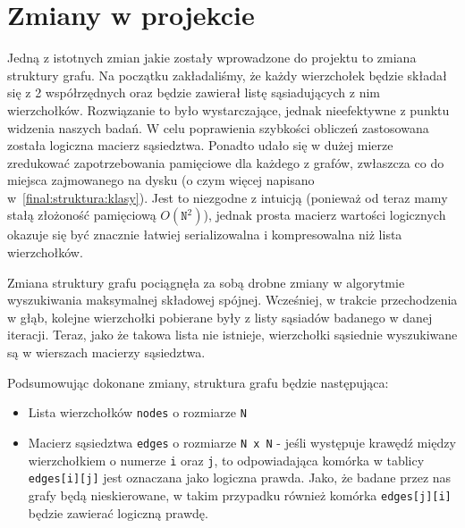 
\section{Zmiany w projekcie}
	\label{final:zmiany}

	Jedną z istotnych zmian jakie zostały wprowadzone do projektu to zmiana struktury grafu. Na początku zakładaliśmy, że każdy wierzchołek będzie składał się z 2 współrzędnych oraz będzie zawierał listę sąsiadujących z nim wierzchołków. Rozwiązanie to było wystarczające, jednak nieefektywne z punktu widzenia naszych badań. W celu poprawienia szybkości obliczeń zastosowana została logiczna macierz sąsiedztwa. Ponadto udało się w dużej mierze zredukować zapotrzebowania pamięciowe dla każdego z grafów, zwłaszcza co do miejsca zajmowanego na dysku (o czym więcej napisano w~\ref{final:struktura:klasy}). Jest to niezgodne z intuicją (ponieważ od teraz mamy stałą złożoność pamięciową $O(\texttt{N}^2)$), jednak prosta macierz wartości logicznych okazuje się być znacznie łatwiej serializowalna i kompresowalna niż lista wierzchołków.

	Zmiana struktury grafu pociągnęła za sobą drobne zmiany w algorytmie wyszukiwania maksymalnej składowej spójnej. Wcześniej, w trakcie przechodzenia w głąb, kolejne wierzchołki pobierane były z listy sąsiadów badanego w danej iteracji. Teraz, jako że takowa lista nie istnieje, wierzchołki sąsiednie wyszukiwane są w wierszach macierzy sąsiedztwa.

	Podsumowując dokonane zmiany, struktura grafu będzie następująca:
	\begin{itemize}
		\item Lista wierzchołków \texttt{nodes} o rozmiarze \texttt{N}
		\item Macierz sąsiedztwa \texttt{edges} o rozmiarze \texttt{N x N} - jeśli występuje krawędź między wierzchołkiem o numerze \texttt{i} oraz \texttt{j}, to odpowiadająca komórka w tablicy \texttt{edges[i][j]} jest oznaczana jako logiczna prawda. Jako, że badane przez nas grafy będą nieskierowane, w takim przypadku również komórka \texttt{edges[j][i]} będzie zawierać logiczną prawdę.
	\end{itemize}


